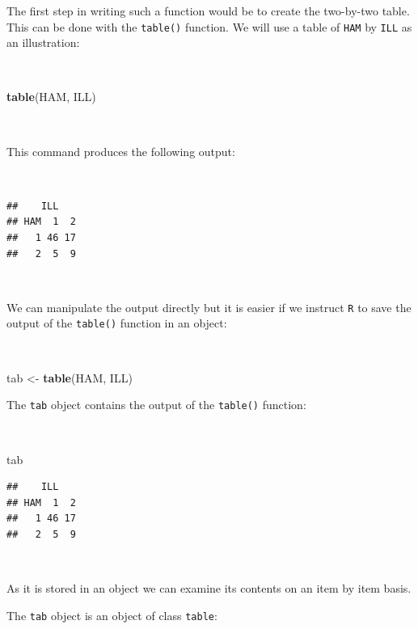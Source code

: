 \documentclass[12pt,a4paper]{book}
\newenvironment{Shaded}{\begin{snugshade}}{\end{snugshade}}
\newcommand{\KeywordTok}[1]{\textcolor[rgb]{0.13,0.29,0.53}{\textbf{#1}}}
\newcommand{\StringTok}[1]{\textcolor[rgb]{0.31,0.60,0.02}{#1}}
\newcommand{\NormalTok}[1]{#1}
\theoremstyle{definition}
\theoremstyle{definition}
\theoremstyle{definition}
\theoremstyle{remark}
\begin{document}
The first step in writing such a function would be to create the
two-by-two table. This can be done with the \texttt{table()} function.
We will use a table of \texttt{HAM} by \texttt{ILL} as an illustration:

~

\begin{Shaded}
\begin{Highlighting}[]
\KeywordTok{table}\NormalTok{(HAM, ILL)}
\end{Highlighting}
\end{Shaded}

~

This command produces the following output:

~

\begin{verbatim}
##    ILL
## HAM  1  2
##   1 46 17
##   2  5  9
\end{verbatim}

~

We can manipulate the output directly but it is easier if we instruct
\texttt{R} to save the output of the \texttt{table()} function in an
object:

~

\begin{Shaded}
\begin{Highlighting}[]
\NormalTok{tab <-}\StringTok{ }\KeywordTok{table}\NormalTok{(HAM, ILL)}
\end{Highlighting}
\end{Shaded}

\newpage

The \texttt{tab} object contains the output of the \texttt{table()}
function:

~

\begin{Shaded}
\begin{Highlighting}[]
\NormalTok{tab}
\end{Highlighting}
\end{Shaded}

\begin{verbatim}
##    ILL
## HAM  1  2
##   1 46 17
##   2  5  9
\end{verbatim}

~

As it is stored in an object we can examine its contents on an item by
item basis.

The \texttt{tab} object is an object of class \texttt{table}:

~
\end{document}
